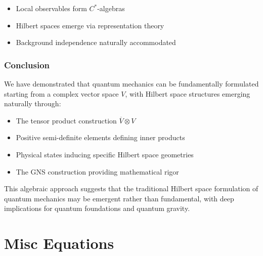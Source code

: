 \documentclass[aps,preprint]{revtex4}
\begin{document}
\begin{itemize}
\item Local observables form $C^*$-algebras

\item Hilbert spaces emerge via representation theory

\item Background independence naturally accommodated
\end{itemize}

\section{Conclusion}

We have demonstrated that quantum mechanics can be fundamentally formulated
starting from a complex vector space $V$, with Hilbert space structures
emerging naturally through:

\begin{itemize}
\item The tensor product construction $\overline{V} \otimes V$

\item Positive semi-definite elements defining inner products

\item Physical states inducing specific Hilbert space geometries

\item The GNS construction providing mathematical rigor
\end{itemize}

This algebraic approach suggests that the traditional Hilbert space
formulation of quantum mechanics may be emergent rather than fundamental,
with deep implications for quantum foundations and quantum gravity.

\bigskip

\part{Misc Equations}
\end{document}
